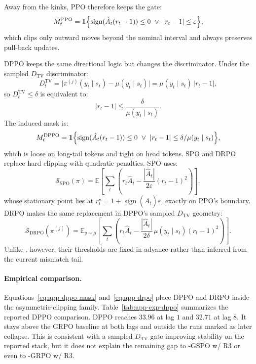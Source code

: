 Away from the kinks, PPO therefore keeps the gate:
\begin{equation}
M_t^{\mathrm{PPO}}=\mathbf 1\Bigl\{\operatorname{sign}(\hat A_t(r_t-1))\le 0\ \vee\ |r_t-1|\le\varepsilon\Bigr\},
\label{eq:app-ppo-mask}
\end{equation}
which clips only outward moves beyond the nominal interval and always preserves pull-back updates.

DPPO keeps the same directional logic but changes the discriminator. Under the sampled $D_{\mathrm{TV}}$ discriminator:
\begin{equation}
D_t^{\mathrm{TV}}=\bigl|\pi^{(j)}(y_t\mid s_t)-\mu(y_t\mid s_t)\bigr|=\mu(y_t\mid s_t)\,|r_t-1|,
\label{eq:app-bintv}
\end{equation}
so $D_t^{\mathrm{TV}}\le\delta$ is equivalent to:
\begin{equation}
|r_t-1|\le \frac{\delta}{\mu(y_t\mid s_t)}.
\label{eq:app-dppo-eps}
\end{equation}
The induced mask is:
\begin{equation}
M_t^{\mathrm{DPPO}}
=\mathbf 1\Bigl\{\operatorname{sign}(\hat A_t(r_t-1))\le 0\ \vee\ |r_t-1|\le\delta/\mu(y_t\mid s_t)\Bigr\},
\label{eq:app-dppo-mask}
\end{equation}
which is loose on long-tail tokens and tight on head tokens. SPO and DRPO replace hard clipping with quadratic penalties. SPO uses:
\begin{equation}
\mathcal S_{\mathrm{SPO}}(\pi)
=\mathbb E\left[\sum_t\left(r_t\hat A_t-\frac{|\hat A_t|}{2\varepsilon}(r_t-1)^2\right)\right],
\label{eq:app-spo}
\end{equation}
whose stationary point lies at $r_t^{\star}=1+\operatorname{sign}(\hat A_t)\varepsilon$, exactly on PPO's boundary. DRPO makes the same replacement in DPPO's sampled $D_{\mathrm{TV}}$ geometry:
\begin{equation}
\mathcal S_{\mathrm{DRPO}}(\pi^{(j)})
=\mathbb E_{y\sim\mu}\left[\sum_t\left(r_t\hat A_t-\frac{|\hat A_t|}{2\delta}\,\mu(y_t\mid s_t)(r_t-1)^2\right)\right].
\label{eq:app-drpo}
\end{equation}
Unlike \satr{}, however, their thresholds are fixed in advance rather than inferred from the current mismatch tail.

\paragraph{Empirical comparison.}
Equations~\eqref{eq:app-dppo-mask} and~\eqref{eq:app-drpo} place DPPO and DRPO inside the asymmetric-clipping family. Table~\ref{tab:app-exp-dppo} summarizes the reported DPPO comparison. DPPO reaches $33.96$ at lag $1$ and $32.71$ at lag $8$. It stays above the GRPO baseline at both lags and outside the runs marked as later collapse. This is consistent with a sampled $D_{\mathrm{TV}}$ gate improving stability on the reported stack, but it does not explain the remaining gap to \satr-GSPO w/ R3 or even to \satr-GRPO w/ R3.

